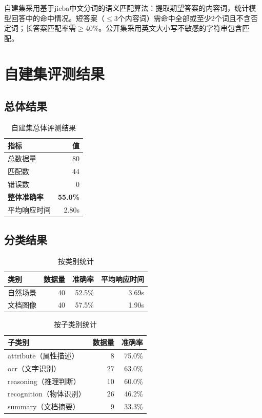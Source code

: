 自建集采用基于jieba中文分词的语义匹配算法：提取期望答案的内容词，统计模型回答中的命中情况。短答案（$\leq$3个内容词）需命中全部或至少2个词且不含否定词；长答案匹配率需$\geq$40\%。公开集采用英文大小写不敏感的字符串包含匹配。

\section{自建集评测结果}

\subsection{总体结果}

\begin{table}[htbp]
  \centering
  \caption{自建集总体评测结果}
  \label{tab:self_overall}
  \begin{tabular}{|l|r|}
    \hline
    \textbf{指标} & \textbf{值} \\
    \hline
    总数据量 & 80 \\
    匹配数 & 44 \\
    错误数 & 0 \\
    \textbf{整体准确率} & \textbf{55.0\%} \\
    平均响应时间 & 2.80s \\
    \hline
  \end{tabular}
\end{table}

\subsection{分类结果}

\begin{table}[htbp]
  \centering
  \caption{按类别统计}
  \label{tab:self_category}
  \begin{tabular}{|l|r|r|r|}
    \hline
    \textbf{类别} & \textbf{数据量} & \textbf{准确率} & \textbf{平均响应时间} \\
    \hline
    自然场景 & 40 & 52.5\% & 3.69s \\
    文档图像 & 40 & 57.5\% & 1.90s \\
    \hline
  \end{tabular}
\end{table}

\begin{table}[htbp]
  \centering
  \caption{按子类别统计}
  \label{tab:self_subcategory}
  \begin{tabular}{|l|r|r|}
    \hline
    \textbf{子类别} & \textbf{数据量} & \textbf{准确率} \\
    \hline
    attribute（属性描述） & 8 & 75.0\% \\
    ocr（文字识别） & 27 & 63.0\% \\
    reasoning（推理判断） & 10 & 60.0\% \\
    recognition（物体识别） & 26 & 46.2\% \\
    summary（文档摘要） & 9 & 33.3\% \\
    \hline
  \end{tabular}
\end{table}

